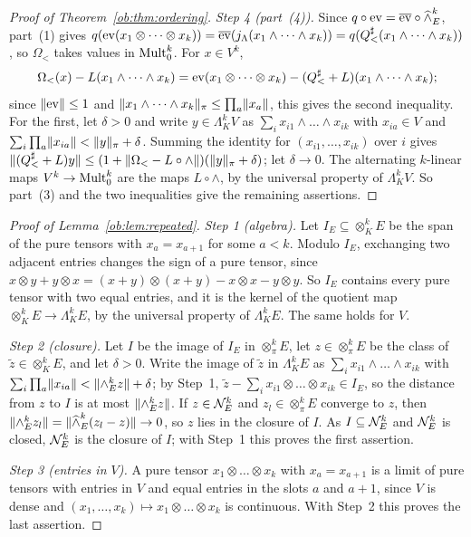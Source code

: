 \begin{proof}[Proof of Theorem~\ref{ob:thm:ordering}]
\emph{Step 4 (part~(4)).} Since $q\circ\operatorname{ev}=\overline{\operatorname{ev}}\circ\widehat\wedge^k_E$, part~(1) gives
$q(\operatorname{ev}(x_1\otimes\dots\otimes x_k))=\overline{\operatorname{ev}}(j_\Lambda(x_1\wedge\dots\wedge x_k))=q(Q^\sharp_<(x_1\wedge\dots\wedge x_k))$,
so $\Omega_<$ takes values in $\operatorname{Mult}^k_0$. For $x\in V^k$,
\[
 \Omega_<(x)-L(x_1\wedge\dots\wedge x_k)=\operatorname{ev}(x_1\otimes\dots\otimes x_k)-(Q^\sharp_<+L)(x_1\wedge\dots\wedge x_k);
\]
since $\lVert \operatorname{ev}\rVert\le1$ and $\lVert x_1\wedge\dots\wedge x_k\rVert_\pi\le\prod_a\lVert x_a\rVert$, this gives the second inequality. For the
first, let $\delta>0$ and write $y\in\Lambda^k_KV$ as $\sum_ix_{i1}\wedge\dots\wedge x_{ik}$ with $x_{ia}\in V$ and
$\sum_i\prod_a\lVert x_{ia}\rVert<\lVert y\rVert_\pi+\delta$. Summing the identity for $(x_{i1},\dots,x_{ik})$ over $i$ gives
$\lVert (Q^\sharp_<+L)y\rVert\le(1+\lVert \Omega_<-L\circ\wedge\rVert)(\lVert y\rVert_\pi+\delta)$; let $\delta\to0$. The alternating $k$-linear
maps $V^k\to\operatorname{Mult}^k_0$ are the maps $L\circ\wedge$, by the universal property of $\Lambda^k_KV$. So part~(3) and the two
inequalities give the remaining assertions.
\end{proof}

\begin{proof}[Proof of Lemma~\ref{ob:lem:repeated}]
\emph{Step 1 (algebra).} Let $I_E\subseteq\otimes^k_KE$ be the span of the pure tensors with $x_a=x_{a+1}$ for some $a<k$.
Modulo $I_E$, exchanging two adjacent entries changes the sign of a pure tensor, since
$x\otimes y+y\otimes x=(x+y)\otimes(x+y)-x\otimes x-y\otimes y$. So $I_E$ contains every pure tensor with two equal entries,
and it is the kernel of the quotient map $\otimes^k_KE\to\Lambda^k_KE$, by the universal property of $\Lambda^k_KE$. The
same holds for $V$.

\emph{Step 2 (closure).} Let $I$ be the image of $I_E$ in $\otimes^k_\pi E$, let $z\in\otimes^k_\pi E$ be the class of
$\tilde z\in\otimes^k_KE$, and let $\delta>0$. Write the image of $\tilde z$ in $\Lambda^k_KE$ as
$\sum_ix_{i1}\wedge\dots\wedge x_{ik}$ with $\sum_i\prod_a\lVert x_{ia}\rVert<\lVert \wedge^k_Ez\rVert+\delta$; by Step~1,
$\tilde z-\sum_ix_{i1}\otimes\dots\otimes x_{ik}\in I_E$, so the distance from $z$ to $I$ is at most $\lVert \wedge^k_Ez\rVert$. If
$z\in\mathcal N^k_E$ and $z_l\in\otimes^k_\pi E$ converge to $z$, then $\lVert \wedge^k_Ez_l\rVert=\lVert \widehat\wedge^k_E(z_l-z)\rVert\to0$, so
$z$ lies in the closure of $I$. As $I\subseteq\mathcal N^k_E$ and $\mathcal N^k_E$ is closed, $\mathcal N^k_E$ is the closure of $I$; with
Step~1 this proves the first assertion.

\emph{Step 3 (entries in $V$).} A pure tensor $x_1\otimes\dots\otimes x_k$ with $x_a=x_{a+1}$ is a limit of pure tensors with
entries in $V$ and equal entries in the slots $a$ and $a+1$, since $V$ is dense and
$(x_1,\dots,x_k)\mapsto x_1\otimes\dots\otimes x_k$ is continuous. With Step~2 this proves the last assertion.
\end{proof}

